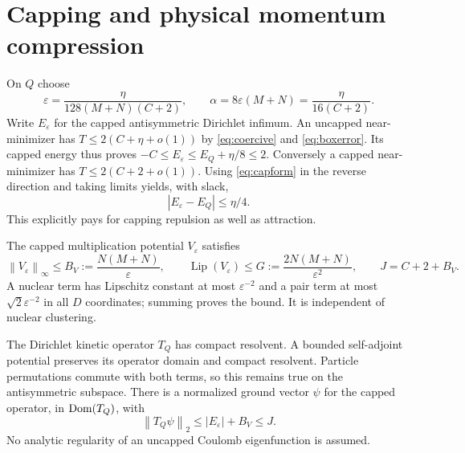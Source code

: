 \documentclass[11pt]{article}
\theoremstyle{remark}\newtheorem{remark}[theorem]{Remark}
\newcommand{\norm}[1]{\left\lVert#1\right\rVert}
\numberwithin{equation}{section}
\begin{document}
\section{Capping and physical momentum compression}
\label{sec:compression}
On $Q$ choose
\begin{equation}\label{eq:eps}
 \varepsilon=\frac{\eta}{128(M+N)(C+2)},\qquad
 \alpha=8\varepsilon(M+N)=\frac{\eta}{16(C+2)}.
\end{equation}
Write $E_\varepsilon$ for the capped antisymmetric Dirichlet infimum.
An uncapped near-minimizer has
$T\leq2(C+\eta+o(1))$ by \eqref{eq:coercive} and \eqref{eq:boxerror}.
Its capped energy thus proves
$-C\leq E_\varepsilon\leq E_Q+\eta/8\leq2$.
Conversely a capped near-minimizer has $T\leq2(C+2+o(1))$.
Using \eqref{eq:capform} in the reverse direction and taking limits yields,
with slack,
\begin{equation}\label{eq:capenergy}
 |E_\varepsilon-E_Q|\leq\eta/4.
\end{equation}
This explicitly pays for capping repulsion as well as attraction.

The capped multiplication potential $V_\varepsilon$ satisfies
\begin{equation}\label{eq:VGJ}
 \norm{V_\varepsilon}_\infty\leq B_V:=\frac{N(M+N)}\varepsilon,
 \qquad \operatorname{Lip}(V_\varepsilon)\leq
 G:=\frac{2N(M+N)}{\varepsilon^2},\qquad J=C+2+B_V.
\end{equation}
A nuclear term has Lipschitz constant at most $\varepsilon^{-2}$ and a pair
term at most $\sqrt2\varepsilon^{-2}$ in all $D$ coordinates; summing proves
the bound. It is independent of nuclear clustering.

The Dirichlet kinetic operator $T_Q$ has compact resolvent. A bounded
self-adjoint potential preserves its operator domain and compact resolvent.
Particle permutations commute with both terms, so this remains true on
the antisymmetric subspace. There is a normalized ground vector $\psi$ for
the capped operator, in $\operatorname{Dom}(T_Q)$, with
\begin{equation}\label{eq:Tnorm}
 \norm{T_Q\psi}_2\leq |E_\varepsilon|+B_V\leq J.
\end{equation}
No analytic regularity of an uncapped Coulomb eigenfunction is assumed.
\end{document}
